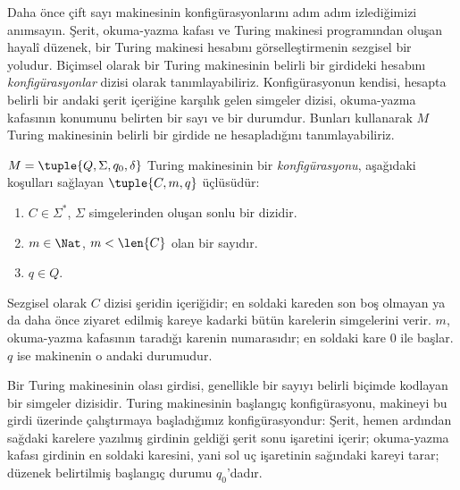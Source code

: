 


\begin{explain}
Daha önce çift sayı makinesinin konfigürasyonlarını adım adım izlediğimizi
anımsayın. Şerit, okuma-yazma kafası ve Turing makinesi programından oluşan
hayalî düzenek, bir Turing makinesi hesabını görselleştirmenin sezgisel bir
yoludur. Biçimsel olarak bir Turing makinesinin belirli bir girdideki hesabını
\emph{konfigürasyonlar} dizisi olarak tanımlayabiliriz. Konfigürasyonun
kendisi, hesapta belirli bir andaki şerit içeriğine karşılık gelen simgeler
dizisi, okuma-yazma kafasının konumunu belirten bir sayı ve bir durumdur.
Bunları kullanarak $M$ Turing makinesinin belirli bir girdide ne hesapladığını
tanımlayabiliriz.
\end{explain}

\begin{defn}[Konfigürasyon]
$M=\tuple{Q,\Sigma,q_0,\delta}$ Turing makinesinin bir
\emph{konfigürasyonu}, aşağıdaki koşulları sağlayan
$\tuple{C,m,q}$ üçlüsüdür:
\begin{enumerate}
\item $C\in\Sigma^*$, $\Sigma$ simgelerinden oluşan sonlu bir dizidir.
\item $m\in\Nat$, $m<\len{C}$ olan bir sayıdır.
\item $q\in Q$.
\end{enumerate}
Sezgisel olarak $C$ dizisi şeridin içeriğidir; en soldaki kareden son boş
olmayan ya da daha önce ziyaret edilmiş kareye kadarki bütün karelerin
simgelerini verir. $m$, okuma-yazma kafasının taradığı karenin numarasıdır;
en soldaki kare $0$ ile başlar. $q$ ise makinenin o andaki durumudur.
\end{defn}

\begin{explain}
Bir Turing makinesinin olası girdisi, genellikle bir sayıyı belirli biçimde
kodlayan bir simgeler dizisidir. Turing makinesinin başlangıç konfigürasyonu,
makineyi bu girdi üzerinde çalıştırmaya başladığımız konfigürasyondur: Şerit,
hemen ardından sağdaki karelere yazılmış girdinin geldiği şerit sonu işaretini
içerir; okuma-yazma kafası girdinin en soldaki karesini, yani sol uç
işaretinin sağındaki kareyi tarar; düzenek belirtilmiş başlangıç durumu
$q_0$'dadır.
\end{explain}

